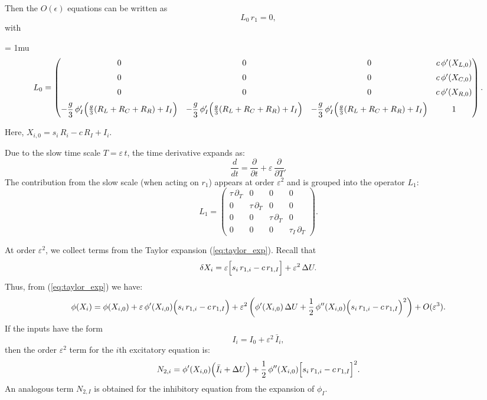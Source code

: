 \documentclass[ENG]{fancynotes}
\begin{document}
Then the $O(\epsilon)$ equations can be written as
\[
L_0\,r_1 = 0,
\]
with
\begin{frame}
\footnotesize
\setlength{\arraycolsep}{2.5pt} %
\medmuskip = 1mu %
\[ 
  L_0 = \begin{pmatrix}
    0 & 0 & 0 & c\,\phi'(X_{L,0}) \\[2mm]
    0 & 0 & 0 & c\,\phi'(X_{C,0}) \\[2mm]
    0 & 0 & 0 & c\,\phi'(X_{R,0}) \\[2mm]
    -\dfrac{g}{3}\,\phi_I'\Bigl(\frac{g}{3}(R_L+R_C+R_R)+I_I\Bigr) & -\dfrac{g}{3}\,\phi_I'\Bigl(\frac{g}{3}(R_L+R_C+R_R)+I_I\Bigr) & -\dfrac{g}{3}\,\phi_I'\Bigl(\frac{g}{3}(R_L+R_C+R_R)+I_I\Bigr) & 1
  \end{pmatrix}.
  \label{eq:L0_matrix}
\]
\end{frame}
Here, \(X_{i,0} = s_i\,R_i - c\,R_I + I_i\). 
\bigskip
\bigskip

Due to the slow time scale \(T=\varepsilon\,t\), the time derivative expands as:
\[
\frac{d}{dt} = \frac{\partial}{\partial t} + \varepsilon\,\frac{\partial}{\partial T}.
\]
The contribution from the slow scale (when acting on \(r_1\)) appears at order \(\varepsilon^2\) and is grouped into the operator \(L_1\):
\begin{equation}
  L_1 = \begin{pmatrix}
    \tau\,\partial_T & 0 & 0 & 0 \\[2mm]
    0 & \tau\,\partial_T & 0 & 0 \\[2mm]
    0 & 0 & \tau\,\partial_T & 0 \\[2mm]
    0 & 0 & 0 & \tau_I\,\partial_T
  \end{pmatrix}.
  \label{eq:L1_matrix}
\end{equation}

\bigskip
At order \(\varepsilon^2\), we collect terms from the Taylor expansion (\ref{eq:taylor_exp}). Recall that
\[
\delta X_i = \varepsilon\Bigl[s_i\,r_{1,i}-c\,r_{1,I}\Bigr] + \varepsilon^2\,\Delta U.
\]
Thus, from (\ref{eq:taylor_exp}) we have:
\begin{equation}
  \phi(X_i) = \phi(X_{i,0}) + \varepsilon\,\phi'(X_{i,0})\Bigl(s_i\,r_{1,i}-c\,r_{1,I}\Bigr) + \varepsilon^2\left(\phi'(X_{i,0})\,\Delta U + \frac{1}{2}\,\phi''(X_{i,0})\Bigl(s_i\,r_{1,i}-c\,r_{1,I}\Bigr)^2\right) + O(\varepsilon^3).
  \label{eq:taylor_full2}
\end{equation}
If the inputs have the form
\[
I_i = I_0 + \varepsilon^2\,\bar{I}_i,
\]
then the order \(\varepsilon^2\) term for the \(i\)th excitatory equation is:
\begin{equation}
  N_{2,i} = \phi'(X_{i,0})\Bigl(\bar{I}_i + \Delta U\Bigr) + \frac{1}{2}\,\phi''(X_{i,0})\Bigl[s_i\,r_{1,i}-c\,r_{1,I}\Bigr]^2.
  \label{eq:N2_excitatory}
\end{equation}
An analogous term \(N_{2,I}\) is obtained for the inhibitory equation from the expansion of \(\phi_I\).
\end{document}
